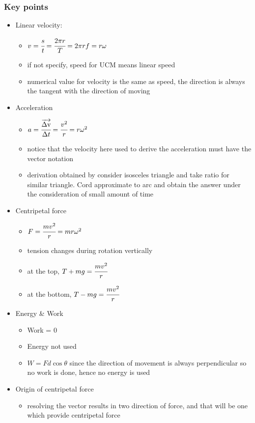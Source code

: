 \documentclass[]{article}
\begin{document}
\subsubsection{Key points}\label{header-n45}

\begin{itemize}
\item
  Linear velocity:

  \begin{itemize}
  \item
    \(v =\cfrac{s}{t} = \cfrac{2\pi r}{T} =2\pi rf = r\omega \)
  \item
    if not specify, speed for UCM means linear speed
  \item
    numerical value for velocity is the same as speed, the direction is
    always the tangent with the direction of moving
  \end{itemize}
\item
  Acceleration

  \begin{itemize}
  \item
    \(a = \cfrac{\overrightarrow{\rm \Delta v}}{\Delta t} =  \cfrac{v^2}{r} = r\omega^2\)
  \item
    notice that the velocity here used to derive the acceleration must
    have the vector notation
  \item
    derivation obtained by consider isosceles triangle and take ratio
    for similar triangle. Cord approximate to arc and obtain the answer
    under the consideration of small amount of time
  \end{itemize}
\item
  Centripetal force

  \begin{itemize}
  \item
    \(F = \cfrac{mv^2}{r} = mr\omega^2\)
  \item
    tension changes during rotation vertically
  \item
    at the top, \(T+mg = \cfrac{mv^2}{r}\)
  \item
    at the bottom, \(T-mg = \cfrac{mv^2}{r}\)
  \end{itemize}
\item
  Energy \& Work

  \begin{itemize}
  \item
    Work = 0
  \item
    Energy not used
  \item
    \(W = Fd \cos{\theta}\) since the direction of movement is always
    perpendicular so no work is done, hence no energy is used
  \end{itemize}
\item
  Origin of centripetal force

  \begin{itemize}
  \item
    resolving the vector results in two direction of force, and that
    will be one which provide centripetal force
  \end{itemize}
\end{itemize}
\end{document}
